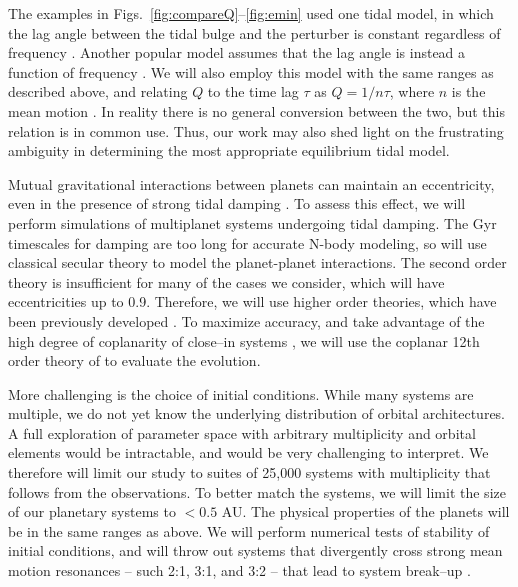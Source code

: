 The examples in Figs.~\ref{fig:compareQ}--\ref{fig:emin} used one
tidal model, in which the lag angle between the tidal bulge and the
perturber is constant regardless of frequency
\citep[e.g.][]{GoldreichSoter66,Jackson08}.  Another popular model
assumes that the lag angle is instead a function of frequency
\citep[e.g.][]{Hut81,Matsumura10}.  We will also employ this model
with the same ranges as described above, and relating $Q$ to the time
lag $\tau$ as $Q = 1/n\tau$, where $n$ is the mean motion
\citep[e.g.][]{Correia12}.  In reality there is no general conversion between
the two, but this relation is in common use.  Thus, our work may also
shed light on the frustrating ambiguity in determining the most
appropriate equilibrium tidal model.

\medskip
{\centerline{}}
\smallskip

Mutual
gravitational interactions between planets can maintain an
eccentricity, even in the presence of strong tidal damping
\citep{MardlingLin02,GreenbergVanLaerhoven11,Correia12}.  To assess this effect, we
will perform simulations of multiplanet systems undergoing tidal
damping. The Gyr 
timescales for damping are too long for accurate N-body modeling, so will use classical secular theory to model the planet-planet interactions. The second order theory is
insufficient for many of the cases we consider, which will have
eccentricities up to 0.9.  Therefore, we will use higher order
theories, which have been previously developed
\citep[e.g.][]{Ford00,VerasArmitage04,LibertHenrard05}. To maximize accuracy, and take advantage of the high degree of coplanarity of close--in
\kepler systems \cite{Fabrycky12}, we will use the coplanar 12th order theory of \cite{LibertHenrard05} to evaluate
the evolution.

More challenging is the choice of initial conditions.  While many
\kepler systems are multiple, we do not yet know the underlying
distribution of orbital architectures.  A full exploration of
parameter space with arbitrary multiplicity and orbital elements would
be intractable, and would be very challenging to interpret.  We
therefore will limit our study to suites of 25,000 systems with
multiplicity that follows from the observations.  To better match
the \kepler systems, we will limit the size of our planetary systems
to $<0.5$ AU. The physical properties of the planets will be in the
same ranges as above. We will perform numerical tests of stability of
initial conditions, and will throw out systems that divergently cross
strong mean motion resonances -- such 2:1, 3:1, and 3:2 -- that lead
to system break--up \citep[e.g.][]{Gomes05}.

